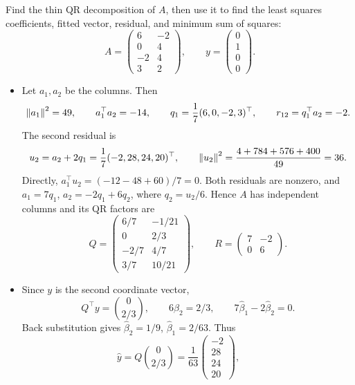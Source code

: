 \begin{example}\label{example:06:qr-ls}
Find the thin QR decomposition of \(A\), then use it to find the least
squares coefficients, fitted vector, residual, and minimum sum of squares:
\[
A=\begin{pmatrix}6&-2\\0&4\\-2&4\\3&2\end{pmatrix},\qquad
 y=\begin{pmatrix}0\\1\\0\\0\end{pmatrix}.
\]
\par\smallskip
{}
\begin{itemize}
\item Let \(a_1,a_2\) be the columns. Then
  \[
  \left\lVert a_1\right\rVert^2=49,\qquad a_1^\top a_2=-14,\qquad
  q_1=\frac17(6,0,-2,3)^\top,\qquad r_{12}=q_1^\top a_2=-2.
  \]
  The second residual is
  \[
  u_2=a_2+2q_1=\frac17(-2,28,24,20)^\top,
  \qquad \left\lVert u_2\right\rVert^2=\frac{4+784+576+400}{49}=36.
  \]
  Directly, \(a_1^\top u_2=(-12-48+60)/7=0\).
  Both residuals are nonzero, and
  \(a_1=7q_1\), \(a_2=-2q_1+6q_2\), where \(q_2=u_2/6\).
  Hence \(A\) has independent columns and its QR factors are
  \[
  Q=\begin{pmatrix}
  6/7&-1/21\\0&2/3\\-2/7&4/7\\3/7&10/21
  \end{pmatrix},\qquad
  R=\begin{pmatrix}7&-2\\0&6\end{pmatrix}.
  \]
\end{itemize}
\begin{itemize}
\item Since \(y\) is the second coordinate vector,
  \[
  Q^\top y=\binom{0}{2/3},\qquad
  6\hat\beta_2=2/3,\qquad
  7\hat\beta_1-2\hat\beta_2=0.
  \]
  Back substitution gives \(\hat\beta_2=1/9\),
  \(\hat\beta_1=2/63\). Thus
  \[
  \hat y=Q\binom{0}{2/3}
  =\frac1{63}\begin{pmatrix}-2\\28\\24\\20\end{pmatrix},\qquad
\]
\end{itemize}
\end{example}
